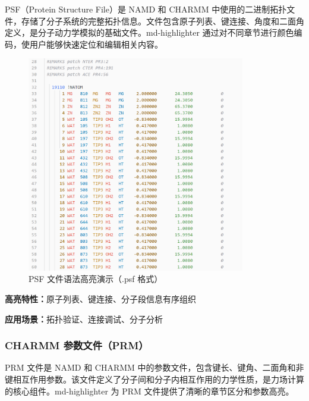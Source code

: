 PSF（Protein Structure File）是 NAMD 和 CHARMM 中使用的二进制拓扑文件，存储了分子系统的完整拓扑信息。文件包含原子列表、键连接、角度和二面角定义，是分子动力学模拟的基础文件。md-highlighter 通过对不同章节进行颜色编码，使用户能够快速定位和编辑相关内容。

\begin{figure}[!h]
    \centering
    \includegraphics[width=0.85\textwidth]{../images/psf.png}
    \caption{PSF 文件语法高亮演示（.psf 格式）}
    \label{fig:psf-highlighting}
\end{figure}

\textbf{高亮特性：}原子列表、键连接、分子段信息有序组织

\textbf{应用场景：}拓扑验证、连接调试、分子分析

\subsubsection{CHARMM 参数文件（PRM）}

PRM 文件是 NAMD 和 CHARMM 中的参数文件，包含键长、键角、二面角和非键相互作用参数。该文件定义了分子间和分子内相互作用的力学性质，是力场计算的核心组件。md-highlighter 为 PRM 文件提供了清晰的章节区分和参数高亮。

